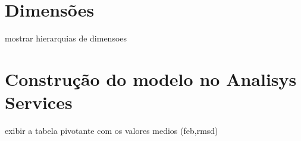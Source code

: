 
\section{Dimensões}
\label{sec:Dimensoes}
	mostrar hierarquias de dimensoes
	
\section{Construção do modelo no Analisys Services}
	exibir a tabela pivotante com os valores medios (feb,rmsd)
